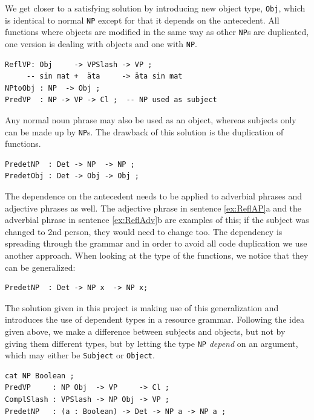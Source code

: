 \documentclass{report}
\begin{document}
We get closer to a satisfying solution by introducing new object type,
\verb_Obj_, which is
identical to normal \verb_NP_ except for that it depends on 
the antecedent. All functions where objects are modified in the same way
as other \verb-NP-s are duplicated, one version is dealing 
with objects and one with \verb-NP-.
\begin{verbatim}
ReflVP: Obj     -> VPSlash -> VP ;
     -- sin mat +  äta     -> äta sin mat 
NPtoObj : NP  -> Obj ;
PredVP  : NP -> VP -> Cl ;  -- NP used as subject
\end{verbatim}
Any normal noun phrase may also be used as an object, whereas subjects only
can be made up by \verb-NP-s.
The drawback of this solution is the duplication of functions.
\begin{verbatim}
PredetNP  : Det -> NP  -> NP ;
PredetObj : Det -> Obj -> Obj ;
\end{verbatim}
The dependence on the antecedent needs to be applied to adverbial phrases and
adjective phrases as well. The adjective phrase in sentence \ref{ex:ReflAP}a and
the adverbial phrase in sentence \ref{ex:ReflAdv}b are examples of this; if the
subject was changed to 2nd person, they  would need to change too.
 \label{ex:ReflAP2} \label{ex:ReflAdv2}
The dependency is spreading through the grammar and in order to avoid all code
duplication we use another approach.
When looking at the type of
the functions, we notice that they can be generalized:
\begin{verbatim}
PredetNP  : Det -> NP x  -> NP x;
\end{verbatim}
The solution given in this project is making use of this generalization and
introduces the use of dependent types in a resource grammar.
Following the idea given above, we make a difference between subjects and objects, but not
by giving them different types, but by %
letting the type \verb-NP- \textit{depend} on an argument, which may either be \verb-Subject- or
\verb-Object-.
\begin{verbatim}
cat NP Boolean ;
PredVP     : NP Obj  -> VP     -> Cl ;
ComplSlash : VPSlash -> NP Obj -> VP ;
PredetNP   : (a : Boolean) -> Det -> NP a -> NP a ;
\end{verbatim}
\end{document}
